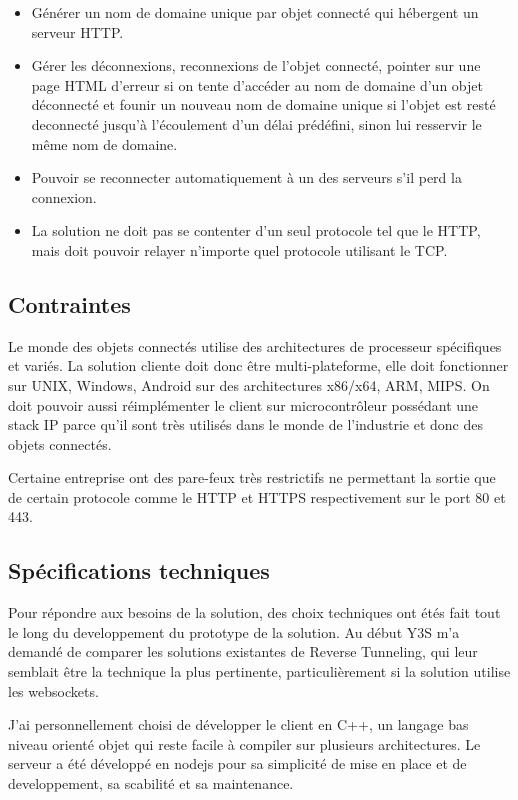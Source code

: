 \begin{itemize}
    \item Générer un nom de domaine unique par objet connecté qui hébergent un serveur HTTP.
    \item Gérer les déconnexions, reconnexions de l'objet connecté, pointer sur une page HTML d'erreur si on tente d'accéder au nom de domaine d'un objet déconnecté et founir un nouveau nom de domaine unique si l'objet est resté deconnecté jusqu'à l'écoulement d'un délai prédéfini, sinon lui resservir le même nom de domaine.
    \item Pouvoir se reconnecter automatiquement à un des serveurs s'il perd la connexion.
    \item La solution ne doit pas se contenter d'un seul protocole tel que le HTTP, mais doit pouvoir relayer n'importe quel protocole utilisant le TCP.
\end{itemize}

\subsection{Contraintes}

Le monde des objets connectés utilise des architectures de processeur spécifiques et variés. La solution cliente doit donc être multi-plateforme, elle doit fonctionner sur UNIX, Windows, Android sur des architectures x86/x64, ARM, MIPS. On doit pouvoir aussi réimplémenter le client sur microcontrôleur possédant une stack IP parce qu'il sont très utilisés dans le monde de l'industrie et donc des objets connectés.

Certaine entreprise ont des pare-feux très restrictifs ne permettant la sortie que de certain protocole comme le HTTP et HTTPS respectivement sur le port 80 et 443.

\subsection{Spécifications techniques}

Pour répondre aux besoins de la solution, des choix techniques ont étés fait tout le long du developpement du prototype de la solution. Au début Y3S m'a demandé de comparer les solutions existantes de Reverse Tunneling, qui leur semblait être la technique la plus pertinente, particulièrement si la solution utilise les websockets.

J'ai personnellement choisi de développer le client en C++, un langage bas niveau orienté objet qui reste facile à compiler sur plusieurs architectures. Le serveur a été développé en nodejs pour sa simplicité de mise en place et de developpement, sa scabilité et sa maintenance.

